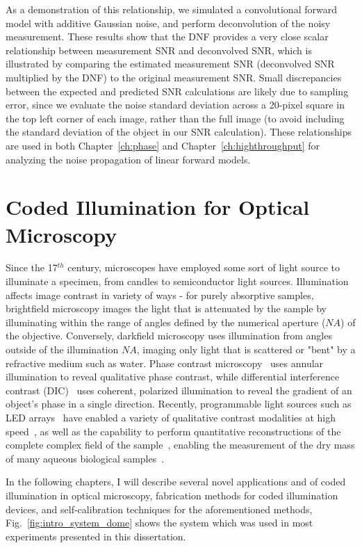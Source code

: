 As a demonstration of this relationship, we simulated a convolutional forward model with additive Gaussian noise, and perform deconvolution of the noisy measurement. These results show that the DNF provides a very close scalar relationship between measurement SNR and deconvolved SNR, which is illustrated by comparing the estimated measurement SNR (deconvolved SNR multiplied by the DNF) to the original measurement SNR. Small discrepancies between the expected and predicted SNR calculations are likely due to sampling error, since we evaluate the noise standard deviation across a 20-pixel square in the top left corner of each image, rather than the full image (to avoid including the standard deviation of the object in our SNR calculation). These relationships are used in both Chapter~\ref{ch:phase} and Chapter~\ref{ch:highthroughput} for analyzing the noise propagation of linear forward models.

\section{Coded Illumination for Optical Microscopy}

Since the 17$^{th}$ century, microscopes have employed some sort of light source to illuminate a specimen, from candles to semiconductor light sources. Illumination affects image contrast in variety of ways - for purely absorptive samples, brightfield microscopy images the light that is attenuated by the sample by illuminating within the range of angles defined by the numerical aperture ($NA$) of the objective. Conversely, darkfield microscopy uses illumination from angles outside of the illumination $NA$, imaging only light that is scattered or "bent" by a refractive medium such as water. Phase contrast microscopy~\cite{zernike1942phase} uses annular illumination to reveal qualitative phase contrast, while differential interference contrast (DIC)~\cite{smithDIC} uses coherent, polarized illumination to reveal the gradient of an object's phase in a single direction. Recently, programmable light sources such as LED arrays~\cite{Zheng2011, albeanu2008led} have enabled a variety of qualitative contrast modalities at high speed~\cite{Zheng2011, zijiMulti}, as well as the capability to perform quantitative reconstructions of the complete complex field of the sample~\cite{Tian3dDpc, Zheng2013, tian2015quantitative}, enabling the measurement of the dry mass of many aqueous biological samples~\cite{popescu2008imaging, popescu2008optical}.

In the following chapters, I will describe several novel applications and of coded illumination in optical microscopy, fabrication methods for coded illumination devices, and self-calibration techniques for the aforementioned methods, Fig.~\ref{fig:intro_system_dome} shows the system which was used in most experiments presented in this dissertation.

